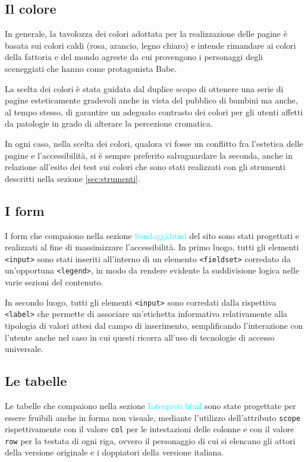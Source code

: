 \documentclass[10pt,a4paper,onecolumn]{article}
\newcommand{\sitepage}[1]{\textcolor{cyan}{\textsf{#1}}}
\begin{document}
\subsection{Il colore}
In generale, la tavolozza dei colori adottata per la realizzazione delle pagine è basata sui colori caldi (rosa, arancio, legno chiaro) e intende rimandare ai colori della fattoria e del mondo agreste da cui provengono i personaggi degli sceneggiati che hanno come protagonista Babe.

La scelta dei colori è stata guidata dal duplice scopo di ottenere una serie di pagine esteticamente gradevoli anche in vista del pubblico di bambini ma anche, al tempo stesso, di garantire un adeguato contrasto dei colori per gli utenti affetti da patologie in grado di alterare la percezione cromatica.

In ogni caso, nella scelta dei colori, qualora vi fosse un conflitto fra l'estetica delle pagine e l'accessibilità, si è sempre preferito salvaguardare la seconda, anche in relazione all'esito dei test sui colori che sono stati realizzati con gli strumenti descritti nella sezione \ref{sec:strumenti}.

\subsection{I form}
I form che compaiono nella sezione \sitepage{Sondaggi.html} del sito sono stati progettati e realizzati al fine di massimizzare l'accessibilità. In primo luogo, tutti gli elementi \texttt{<input>} sono stati inseriti all'interno di un elemento \texttt{<fieldset>} corredato da un'opportuna \texttt{<legend>}, in modo da rendere evidente la suddivisione logica nelle varie sezioni del contenuto.

In secondo luogo, tutti gli elementi \texttt{<input>} sono corredati dalla rispettiva \texttt{<label>} che permette di associare un'etichetta informativa relativamente alla tipologia di valori attesi dal campo di inserimento, semplificando l'interazione con l'utente anche nel caso in cui questi ricorra all'uso di tecnologie di accesso universale.


\subsection{Le tabelle}
Le tabelle che compaiono nella sezione \sitepage{Interpreti.html} sono state progettate per essere fruibili anche in forma non visuale, mediante l'utilizzo dell'attributo \texttt{scope} rispettivamente con il valore \texttt{col} per le intestazioni delle colonne e con il valore \texttt{row} per la testata di ogni riga, ovvero il personaggio di cui si elencano gli attori della versione originale e i doppiatori della versione italiana.
\end{document}
